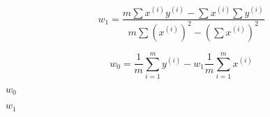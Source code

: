 \documentclass[10pt]{book}
\begin{document}
\begin{mdSnippets}
\begin{mdDisplaySnippet}
\[%
w_1 = \frac{m \sum x^{(i)} y^{(i)} - \sum x^{(i)} \sum y^{(i)}}
  {m \sum (x^{(i)})^2 - (\sum x^{(i)})^2}
\]%
\end{mdDisplaySnippet}%
\begin{mdDisplaySnippet}[6851489da1983751f1011d2478c76d2b]%
\[%
w_0 = \frac{1}{m} \sum_{i=1}^{m} y^{(i)} - w_1 \frac{1}{m}\sum_{i=1}^{m} x^{(i)}
\]%
\end{mdDisplaySnippet}%
\begin{mdInlineSnippet}[ac1052c8c41fa0e8d67714e0723a068b]%
$w_0$\end{mdInlineSnippet}%
\begin{mdInlineSnippet}[db007d6a923c2909d42c4292bffca5f0]%
$w_1$\end{mdInlineSnippet}%

\end{mdSnippets}
\end{document}
